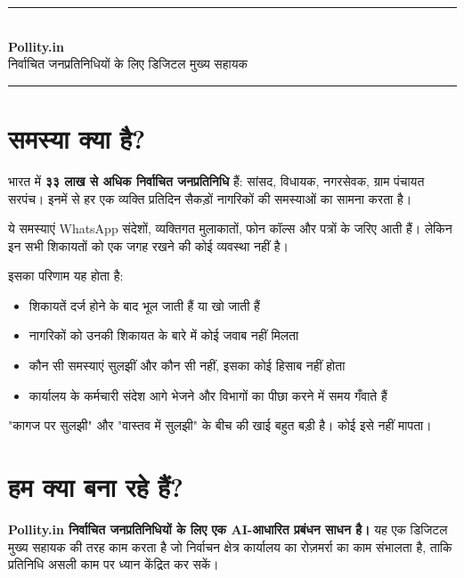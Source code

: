 \documentclass[11pt, a4paper]{article}
\begin{document}
\begin{center}
  {\color{pollityblue}\rule{\linewidth}{1.5pt}}\\[0.5em]
  {\Huge\bfseries\color{pollityblue}\textenglish{Pollity.in}}\\[0.3em]
  {\large निर्वाचित जनप्रतिनिधियों के लिए डिजिटल मुख्य सहायक}\\[0.3em]
  {\color{pollityblue}\rule{\linewidth}{1.5pt}}
\end{center}

\vspace{0.8em}

\section{समस्या क्या है?}

भारत में \textbf{३३ लाख से अधिक निर्वाचित जनप्रतिनिधि} हैं: सांसद, विधायक, नगरसेवक, ग्राम पंचायत सरपंच। इनमें से हर एक व्यक्ति प्रतिदिन सैकड़ों नागरिकों की समस्याओं का सामना करता है।

ये समस्याएं \textenglish{WhatsApp} संदेशों, व्यक्तिगत मुलाकातों, फोन कॉल्स और पत्रों के जरिए आती हैं। लेकिन इन सभी शिकायतों को एक जगह रखने की कोई व्यवस्था नहीं है।

इसका परिणाम यह होता है:

\begin{itemize}[leftmargin=1.5em, itemsep=3pt]
  \item शिकायतें दर्ज होने के बाद भूल जाती हैं या खो जाती हैं
  \item नागरिकों को उनकी शिकायत के बारे में कोई जवाब नहीं मिलता
  \item कौन सी समस्याएं सुलझीं और कौन सी नहीं, इसका कोई हिसाब नहीं होता
  \item कार्यालय के कर्मचारी संदेश आगे भेजने और विभागों का पीछा करने में समय गँवाते हैं
\end{itemize}

"कागज पर सुलझी" और "वास्तव में सुलझी" के बीच की खाई बहुत बड़ी है। कोई इसे नहीं मापता।

\section{हम क्या बना रहे हैं?}

\begin{tcolorbox}[colback=pollityblue!8, colframe=pollityblue, sharp corners, boxrule=0.6pt]
\textbf{\textenglish{Pollity.in} निर्वाचित जनप्रतिनिधियों के लिए एक \textenglish{AI}-आधारित प्रबंधन साधन है।}
यह एक डिजिटल मुख्य सहायक की तरह काम करता है जो निर्वाचन क्षेत्र कार्यालय का रोज़मर्रा का काम संभालता है, ताकि प्रतिनिधि असली काम पर ध्यान केंद्रित कर सकें।
\end{tcolorbox}
\end{document}
